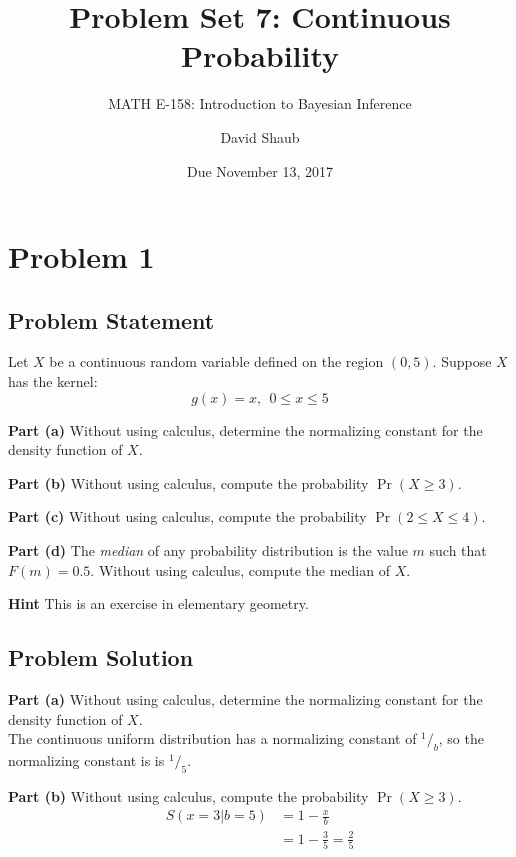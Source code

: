 \documentclass[12pt]{article}
\title{Problem Set 7: Continuous Probability}
\author{MATH E-158: Introduction to Bayesian Inference}
\author{David Shaub}
\date{Due November 13, 2017}
\theoremstyle{definition}
\begin{document}
	
	\maketitle


\section*{Problem 1}


\subsection*{Problem Statement}

Let $X$ be a continuous random variable defined on the region $(0,5)$. Suppose $X$ has the kernel:
$$
g(x) = x, \ \ 0 \leq x \leq 5
$$

\bigskip
\noindent
{\bf Part (a)} Without using calculus, determine the normalizing constant for the density function of $X$.

\bigskip
\noindent
{\bf Part (b)} Without using calculus, compute the probability $\Pr(X \geq 3)$.

\bigskip
\noindent
{\bf Part (c)} Without using calculus, compute the probability $\Pr(2 \leq X \leq 4)$.

\bigskip
\noindent
{\bf Part (d)} The {\em median} of any probability distribution is the value $m$ such that $F(m) = 0.5$. Without using calculus, compute the median of $X$.

\bigskip
\noindent
{\bf Hint} This is an exercise in elementary geometry.





\subsection*{Problem Solution}
\bigskip
\noindent
{\bf Part (a)} Without using calculus, determine the normalizing constant for the density function of $X$.\\

The continuous uniform distribution has a normalizing constant of $^1/_b$, so the normalizing constant is is $^1/_5$.

\bigskip
\noindent
{\bf Part (b)} Without using calculus, compute the probability $\Pr(X \geq 3)$.
\begin{align*}
S(x=3|b=5) &= 1 - \frac{x}{b}\\
&= 1 - \frac{3}{5} = \frac{2}{5}
\end{align*}
\end{document}
